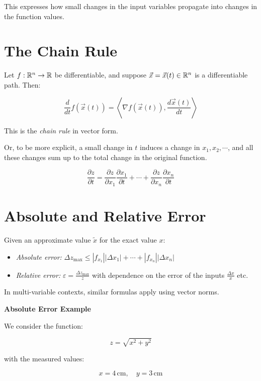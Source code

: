 This expresses how small changes in the input variables propagate into changes in the function values.

\section{The Chain Rule}

Let \( f : \mathbb{R}^n \to \mathbb{R} \) be differentiable, and suppose \( \vec{x} = \vec{x}(t) \in \mathbb{R}^n \) 
is a differentiable path. Then:

\[
    \frac{d}{dt} f(\vec{x}(t)) = \left\langle \nabla f(\vec{x}(t)), \frac{d\vec{x}(t)}{dt} \right\rangle
\]

This is the \emph{chain rule} in vector form.

Or, to be more explicit, a small change in \(t\) induces a change in \(x_1, x_2, \cdots\), and all these changes 
sum up to the total change in the original function.

\[
    \frac{\partial z}{\partial t} = \frac{\partial z}{\partial x_1}\frac{\partial x_1}{ \partial t} + 
    \cdots + \frac{\partial z}{\partial x_n}\frac{\partial x_n}{\partial t}
\]

\section{Absolute and Relative Error}

Given an approximate value \( \tilde{x} \) for the exact value \(x\):

\begin{itemize}

    \item \emph{Absolute error:} \(\Delta z_{\max} \le |f_{x_1}||\Delta x_1| + \cdots + |f_{x_n}|
          |\Delta x_n| \)

    \item \emph{Relative error:} \( \varepsilon = \frac{\Delta z_{\max}}{z}\) with dependence on the error 
          of the inputs \(\frac{\Delta x}{x}\) etc.

\end{itemize}

In multi-variable contexts, similar formulas apply using vector norms.

\textbf{Absolute Error Example}

We consider the function:

\[
    z = \sqrt{x^2 + y^2}
\]

with the measured values:

\[
    x = 4 \, \text{cm}, \quad y = 3 \, \text{cm}
\]

